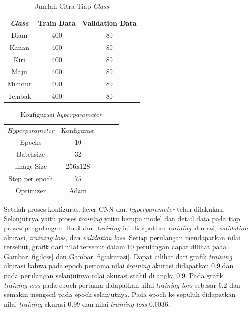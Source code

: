 \begin{table}[H]
  \centering
  \caption{Jumlah Citra Tiap \emph{Class}}
  \label{tab:tiapclass}
  \begin{tabular}{|c|c|c|}
  \hline
  \emph{Class}  & Train Data & Validation Data \\ \hline
  Diam   & 400        & 80              \\ \hline
  Kanan  & 400        & 80              \\ \hline
  Kiri   & 400        & 80              \\ \hline
  Maju   & 400        & 80              \\ \hline
  Mundur & 400        & 80              \\ \hline
  Tembak & 400        & 80              \\ \hline
  \end{tabular}
\end{table}

\begin{table}[H]
  \centering
  \caption{Konfigurasi \emph{hyperparameter}}
  \label{fig:hyperparameter}
  \begin{tabular}{|c|c|lll}
  \cline{1-2}
  \emph{Hyperparameter} & Konfigurasi \\ \cline{1-2}
  Epochs         & 10 \\ \cline{1-2}
  Batchsize      & 32 \\ \cline{1-2}
  Image Size     & 256x128 \\ \cline{1-2}
  Step per epoch      & 75 \\ \cline{1-2}
  Optimizer      & Adam \\ \cline{1-2}
  \end{tabular}
\end{table}

Setelah proses konfigurasi layer CNN dan \emph{hyperparameter} telah dilakukan. Selanjutnya yaitu proses \emph{training} yaitu berupa model dan detail data pada tiap proses pengulangan. Hasil dari \emph{training} ini didapatkan \emph{training} akurasi, \emph{validation} akurasi, \emph{training} \emph{loss}, dan \emph{validation} \emph{loss}. Setiap perulangan mendapatkan nilai tersebut, grafik dari nilai tersebut dalam 10 perulangan dapat dilihat pada Gambar \ref*{fig:loss} dan Gambar \ref*{fig:akurasi}. Dapat dilihat dari grafik \emph{training} akurasi bahwa pada epoch pertama nilai \emph{training} akurasi didapatkan 0.9 dan pada perulangan selanjutnya nilai akurasi stabil di angka 0.9. Pada grafik \emph{training loss} pada epoch pertama didapatkan nilai \emph{training loss} sebesar 0.2 dan semakin mengecil pada epoch selanjutnya. Pada epoch ke sepuluh didapatkan nilai \emph{training} akurasi 0.99 dan nilai \emph{training loss} 0.0036. 

